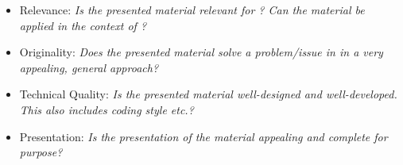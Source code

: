 \begin{itemize}
	\item Relevance: \emph{Is the presented material relevant for \RCAW? Can the material be applied in the context of \RCAW?}
	\item Originality: \emph{Does the presented material solve a problem/issue in \RCAW in a very appealing, general approach?} 
	\item Technical Quality: \emph{Is the presented material well-designed and well-developed. This also includes coding style etc.? }
	\item Presentation: \emph{Is the presentation of the material appealing and complete for \RCAW purpose?}
\end{itemize}

